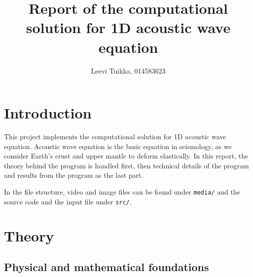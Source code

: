\documentclass[]{article}
\title{Report of the computational solution for 1D acoustic wave equation}
\author{Leevi Tuikka, 014583623}
\begin{document}
\maketitle
{} 

\newpage
{}

\section{Introduction}
This project implements the computational solution for 1D acoustic wave equation. Acoustic wave equation is the basic equation in seismology, as we consider Earth's crust and upper mantle to deform elastically. In this report, the theory behind the program is handled first, then technical details of the program and results from the program as the last part. \par
In the file structure, video and image files can be found under \texttt{media/} and the source code and the input file under \texttt{src/}.

\section{Theory}

\subsection{Physical and mathematical foundations}
\end{document}

